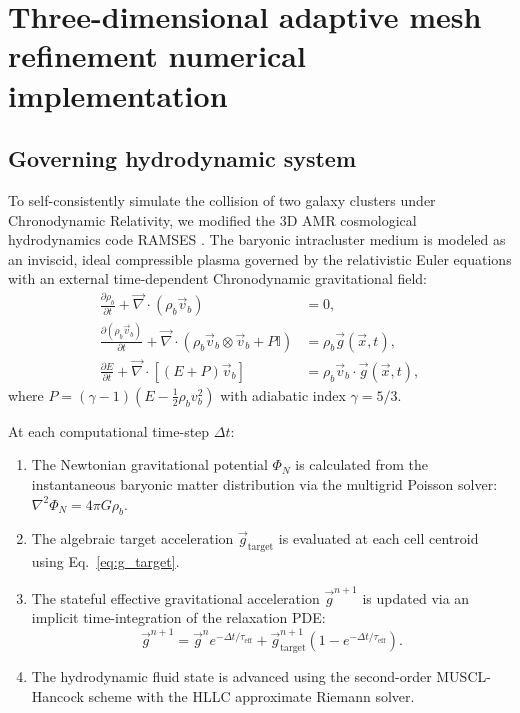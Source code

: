 \documentclass[aps,prd,reprint,superscriptaddress,nofootinbib,floatfix,amsmath,amssymb]{revtex4-2}
\begin{document}
\section{Three-dimensional adaptive mesh refinement numerical implementation}
\label{sec:simulation}

\subsection{Governing hydrodynamic system}

To self-consistently simulate the collision of two galaxy clusters under Chronodynamic Relativity, we modified the 3D AMR cosmological hydrodynamics code \textsc{RAMSES} \cite{Teyssier2002_RAMSES}. The baryonic intracluster medium is modeled as an inviscid, ideal compressible plasma governed by the relativistic Euler equations with an external time-dependent Chronodynamic gravitational field:
\begin{align}
\frac{\partial \rho_b}{\partial t} + \vec{\nabla} \cdot (\rho_b \vec{v}_b) &= 0, \label{eq:euler_mass} \\
\frac{\partial (\rho_b \vec{v}_b)}{\partial t} + \vec{\nabla} \cdot (\rho_b \vec{v}_b \otimes \vec{v}_b + P \mathbb{I}) &= \rho_b \vec{g}(\vec{x}, t), \label{eq:euler_mom} \\
\frac{\partial E}{\partial t} + \vec{\nabla} \cdot \left[ (E + P)\vec{v}_b \right] &= \rho_b \vec{v}_b \cdot \vec{g}(\vec{x}, t), \label{eq:euler_energy}
\end{align}
where $P = (\gamma - 1)(E - \frac{1}{2}\rho_b v_b^2)$ with adiabatic index $\gamma = 5/3$.

At each computational time-step $\Delta t$:
\begin{enumerate}
    \item The Newtonian gravitational potential $\Phi_N$ is calculated from the instantaneous baryonic matter distribution via the multigrid Poisson solver: $\nabla^2 \Phi_N = 4\pi G \rho_b$.
    \item The algebraic target acceleration $\vec{g}_{\text{target}}$ is evaluated at each cell centroid using Eq.~\eqref{eq:g_target}.
    \item The stateful effective gravitational acceleration $\vec{g}^{n+1}$ is updated via an implicit time-integration of the relaxation PDE:
    \begin{equation}
    \vec{g}^{n+1} = \vec{g}^n e^{-\Delta t / \tau_{\text{eff}}} + \vec{g}_{\text{target}}^{n+1} \left(1 - e^{-\Delta t / \tau_{\text{eff}}}\right).
    \label{eq:discrete_update}
    \end{equation}
    \item The hydrodynamic fluid state is advanced using the second-order MUSCL-Hancock scheme with the HLLC approximate Riemann solver.
\end{enumerate}
\end{document}

